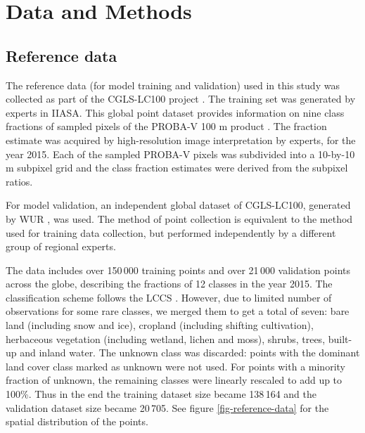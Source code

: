 \documentclass[review,authoryear,3p]{elsarticle}
\begin{document}
\section{Data and Methods}

\subsection{Reference data}

The reference data (for model training and validation) used in this study was collected as part of the \ac{CGLS-LC100} project \citep{buchhorn_copernicus_2020, nandin-erdene_tsendbazar_copernicus_2019}.
The training set was generated by experts in \ac{IIASA}.
This global point dataset provides information on nine class fractions of sampled pixels of the PROBA-V 100 m product \citep{dierckx2014probav}.
The fraction estimate was acquired by high-resolution image interpretation by experts, for the year 2015.
Each of the sampled PROBA-V pixels was subdivided into a 10-by-10 m subpixel grid and the class fraction estimates were derived from the subpixel ratios.

For model validation, an independent global dataset of \ac{CGLS-LC100}, generated by \gls{WUR} \citep{tsendbazar_developing_2018}, was used.
The method of point collection is equivalent to the method used for training data collection, but performed independently by a different group of regional experts.

The data includes over 150\,000 training points and over 21\,000 validation points across the globe, describing the fractions of 12 classes in the year 2015.
The classification scheme follows the \gls{LCCS} \citep{buchhorn_copernicus_2020}.
However, due to limited number of observations for some rare classes, we merged them to get a total of seven: bare land (including snow and ice), cropland (including shifting cultivation), herbaceous vegetation (including wetland, lichen and moss), shrubs, trees, built-up and inland water.
The unknown class was discarded: points with the dominant land cover class marked as unknown were not used.
For points with a minority fraction of unknown, the remaining classes were linearly rescaled to add up to 100\%.
Thus in the end the training dataset size became 138\,164 and the validation dataset size became 20\,705. See figure \ref{fig-reference-data} for the spatial distribution of the points.

\end{document}
